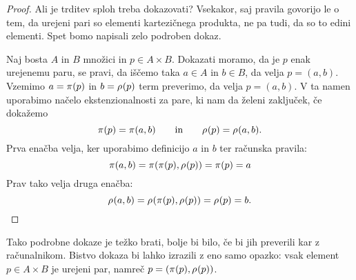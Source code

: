 \begin{proof}
  Ali je trditev sploh treba dokazovati? Vsekakor, saj pravila govorijo le o tem, da
  urejeni pari so elementi kartezičnega produkta, ne pa tudi, da so to edini elementi.
  Spet bomo napisali zelo podroben dokaz.

  Naj bosta $A$ in $B$ množici in $p \in A \times B$. Dokazati moramo, da je $p$ enak
  urejenemu paru, se pravi, da iščemo taka $a \in A$ in $b \in B$, da velja $p = (a, b)$.
  Vzemimo $a = \fst(p)$ in $b = \snd(p)$ term preverimo, da velja $p = (a, b)$. V ta namen
  uporabimo načelo ekstenzionalnosti za pare, ki nam da želeni zaključek, če dokažemo
  \begin{equation*}
    \fst(p) = \fst(a, b)
    \qquad\text{in}\qquad
    \snd(p) = \snd(a, b).
  \end{equation*}
  Prva enačba velja, ker uporabimo definicijo $a$ in $b$ ter računska pravila:
  \begin{equation*}
    \fst(a,b) = \fst(\fst(p), \snd(p)) = \fst(p) = a
  \end{equation*}
  Prav tako velja druga enačba:
  \begin{equation*}
    \snd(a,b) = \snd(\fst(p), \snd(p)) = \snd(p) = b. \qedhere
  \end{equation*}
\end{proof}

Tako podrobne dokaze je težko brati, bolje bi bilo, če bi jih preverili kar z
računalnikom. Bistvo dokaza bi lahko izrazili z eno samo opazko: vsak element
$p \in A \times B$ je urejeni par, namreč $p = (\fst(p), \snd(p))$.






